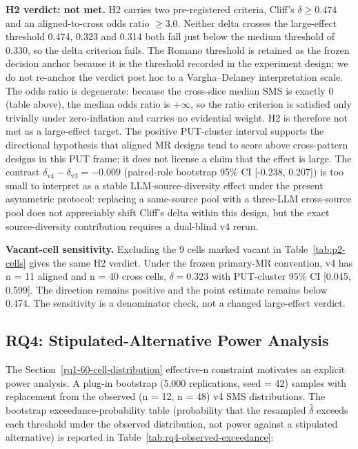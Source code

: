 \documentclass[review,12pt,authoryear]{elsarticle}
\begin{document}
\textbf{H2 verdict: not met.} H2 carries two pre-registered criteria,
Cliff's $\delta \geq 0.474$ and an aligned-to-cross odds ratio
$\geq 3.0$. Neither delta crosses the \citet{romano2006cliff}
large-effect threshold 0.474, 0.323 and 0.314 both fall just below the
\citet{romano2006cliff} medium threshold of 0.330, so the delta criterion fails. The
Romano threshold is retained as the frozen decision anchor because it is
the threshold recorded in the experiment design; we do not re-anchor the
verdict post hoc to a Vargha--Delaney interpretation scale. The
odds ratio is degenerate: because the cross-slice median SMS is exactly
0 (table above), the median odds ratio is $+\infty$, so the ratio
criterion is satisfied only trivially under zero-inflation and carries no
evidential weight. H2 is therefore not met as a large-effect target.
The positive PUT-cluster interval supports the directional hypothesis
that aligned MR designs tend to score above cross-pattern designs in
this PUT frame; it does not license a claim that the effect is large. The
contrast $\delta_{\mathrm{v4}} - \delta_{\mathrm{v3}} = -0.009$ (paired-role
bootstrap 95\% CI {[}-0.238, 0.207{]}) is too small to interpret as a stable LLM-source-diversity effect
under the present asymmetric protocol: replacing a same-source pool with
a three-LLM cross-source pool does not appreciably shift Cliff's delta
within this design, but the exact source-diversity contribution requires
a dual-blind v4 rerun.

\textbf{Vacant-cell sensitivity.} Excluding the 9 cells marked vacant in
Table~\ref{tab:p2-cells} gives the same H2 verdict. Under the frozen
primary-MR convention, v4 has n = 11 aligned and n = 40 cross cells,
$\delta = 0.323$ with PUT-cluster 95\% CI [0.045, 0.599].
The direction remains positive and the point estimate remains below
0.474. The sensitivity is a denominator check, not a changed
large-effect verdict.

\subsection{RQ4: Stipulated-Alternative Power Analysis}\label{rq2-stipulated-alternative-power}

The Section~\ref{rq1-60-cell-distribution} effective-n constraint motivates an explicit power analysis. A
plug-in bootstrap (5,000 replications, seed = 42) samples with
replacement from the observed (n = 12, n = 48) v4 SMS distributions. The
bootstrap exceedance-probability table (probability that the resampled
$\hat\delta$ exceeds each threshold under the observed distribution, not
power against a stipulated alternative) is reported in
Table~\ref{tab:rq4-observed-exceedance}:
\end{document}
